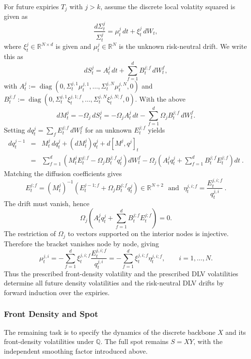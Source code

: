 \documentclass[11pt]{article}
\newcommand{\Q}{\mathbb Q}
\theoremstyle{plain}
\theoremstyle{definition}
\theoremstyle{remark}
\begin{document}
For future expiries $T_j$ with $j>k$, assume the discrete local volatity squared is given as
\[
\frac{ d\Sigma_t^{j} }{ \Sigma_t^{j} }
= \mu^j_t\,dt
+ \xi^j_t\,dW_t,
\]
where $\xi_t^j\in\mathbb R^{N\times d}$ is given and
$\mu_t^j\in\mathbb R^N$ is the unknown risk-neutral drift. We write this as
\[
dS_t^j=A_t^j\,dt+\sum_{f=1}^dB_t^{j;f}\,dW_t^f,
\]
with
$A_t^j
:=\operatorname{diag}(0,\Sigma_t^{j,1}\mu_t^{j,1},\ldots,
\Sigma_t^{j,N}\mu_t^{j,N},0)$ and $B_t^{j;f}
:=\operatorname{diag}(0,\Sigma_t^{j,1}\xi_t^{j,1;f},\ldots,
\Sigma_t^{j,N}\xi_t^{j,N;f},0).$
With the above
\[
dM_t^j=-\Omega_j\,dS_t^j
=-\Omega_jA_t^j\,dt
-\sum_{f=1}^d\Omega_jB_t^{j;f}\,dW_t^f.
\]
Setting $dq_t^j=\sum_fE_t^{j;f}\,dW_t^f$ for an unknown $E_t^{j;f}$ yields
\begin{eqnarray}
dq_t^{j-1}
& = & M_t^j\,dq_t^j+(dM_t^j)q_t^j+d[M^j,q^j]_t\\
& = & \sum_{f=1}^d
\left(M_t^jE_t^{j;f}-\Omega_jB_t^{j;f}q_t^j\right)dW_t^f
-\Omega_j\left(A_t^jq_t^j
+\sum_{f=1}^dB_t^{j;f}E_t^{j;f}\right)dt \ .
\end{eqnarray}
Matching the diffusion coefficients gives
\begin{equation}
\label{eq:vol_hb}
E_t^{j;f}
=(M_t^j)^{-1}
\left(E_t^{j-1;f}+\Omega_jB_t^{j;f}q_t^j\right)
\in\mathbb R^{N+2} \ \ \ \mbox{and} \ \ \ \eta_t^{j,i;f}=\frac{ E_t^{j,i;f} }{ q_t^{j,i} } \ .
\end{equation}
The drift must vanish, hence
\[
\Omega_j\left(A_t^jq_t^j
+\sum_{f=1}^dB_t^{j;f}E_t^{j;f}\right)=0.
\]
The restriction of $\Omega_j$ to vectors supported on the interior nodes
is injective. Therefore the bracket vanishes node by node, giving
\begin{equation}
\label{eq:drift_hb}
\mu_t^{j,i}
=-\sum_{f=1}^d\xi_t^{j,i;f}
\frac{E_t^{j,i;f}}{q_t^{j,i}}
=-\sum_{f=1}^d\xi_t^{j,i;f}\eta_t^{j,i;f},
\qquad i=1,\ldots,N.
\end{equation}
Thus the prescribed front-density volatility and the prescribed DLV
volatilities determine all future density volatilities and the
risk-neutral DLV drifts by forward induction over the expiries.

\subsubsection{Front Density and Spot}
\label{sec:front-density}

The remaining task is to specify the dynamics of the discrete backbone $X$ and its front-density volatilities under $\Q$.
The full spot remains $S=XY$, with the independent smoothing factor introduced above.
\end{document}

